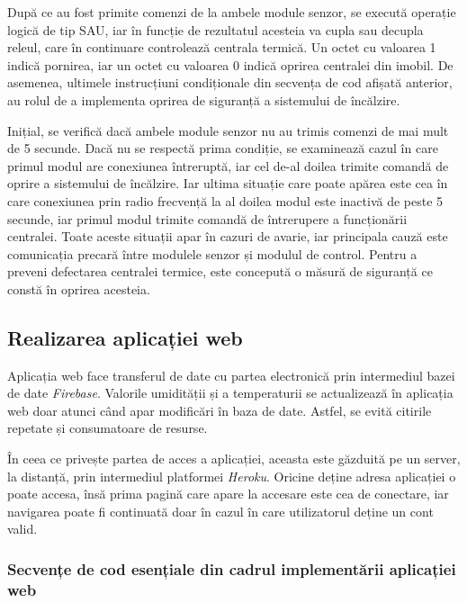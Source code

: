 	După ce au fost primite comenzi de la ambele module senzor, se execută operație logică de tip SAU, iar în funcție de rezultatul acesteia va cupla sau decupla releul, care în continuare controlează centrala termică. Un octet cu valoarea 1 indică pornirea, iar un octet cu valoarea 0 indică oprirea centralei din imobil. De asemenea, ultimele instrucțiuni condiționale din secvența de cod afișată anterior, au rolul de a implementa oprirea de siguranță a sistemului de încălzire. 

	Inițial, se verifică dacă ambele module senzor nu au trimis comenzi de mai mult de 5 secunde. Dacă nu se respectă prima condiție, se examinează cazul în care primul modul are conexiunea întreruptă, iar cel de-al doilea trimite comandă de oprire a sistemului de încălzire. Iar ultima situație care poate apărea este cea în care conexiunea prin radio frecvență la al doilea modul este inactivă de peste 5 secunde, iar primul modul trimite comandă de întrerupere a funcționării centralei. Toate aceste situații apar în cazuri de avarie, iar principala cauză este comunicația precară între modulele senzor și modulul de control. Pentru a preveni defectarea centralei termice, este concepută o măsură de siguranță ce constă în oprirea acesteia.  

\subsection{Realizarea aplicației web}

	Aplicația web face transferul de date cu partea electronică prin intermediul bazei de date \textit{Firebase}. Valorile umidității și a temperaturii se actualizează în aplicația web doar atunci când apar modificări în baza de date. Astfel, se evită citirile repetate și consumatoare de resurse.
	
	În ceea ce privește partea de acces a aplicației, aceasta este găzduită pe un server, la distanță, prin intermediul platformei \textit{Heroku}. Oricine deține adresa aplicației o poate accesa, însă prima pagină care apare la accesare este cea de conectare, iar navigarea poate fi continuată doar în cazul în care utilizatorul deține un cont valid. 
	
\vspace{1em}

\subsubsection{Secvențe de cod esențiale din cadrul implementării aplicației web}

